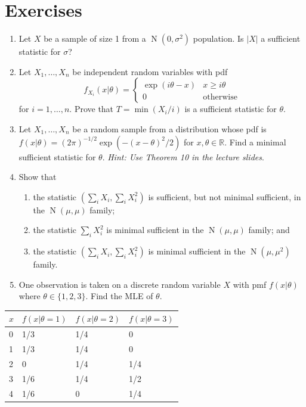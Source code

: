 \documentclass[
]{book}
\DeclareMathOperator{\N}{N}
\newcommand{\bbR}{\mathbb{R}}
\theoremstyle{definition}
\theoremstyle{definition}
\theoremstyle{definition}
\theoremstyle{definition}
\theoremstyle{remark}
\begin{document}
\hypertarget{exercises-3}{%
\section{Exercises}\label{exercises-3}}

\begin{enumerate}
\def\labelenumi{\arabic{enumi}.}
\item
  Let \(X\) be a sample of size 1 from a \(\N(0,\sigma^2)\) population. Is \(|X|\) a sufficient statistic for \(\sigma\)?
\item
  Let \(X_1,\dots,X_n\) be independent random variables with pdf
  \[
  f_{X_i}(x|\theta) = \begin{cases}
   \exp(i\theta - x) &x\geq i\theta \\
   0   &\text{otherwise}
  \end{cases}
  \]
  for \(i=1,\dots,n\). Prove that \(T=\min(X_i/i)\) is a sufficient statistic for \(\theta\).
\item
  Let \(X_1,\dots,X_n\) be a random sample from a distribution whose pdf is \(f(x|\theta)=(2\pi)^{-1/2}\exp(-(x-\theta)^2/2)\) for \(x,\theta\in\bbR\). Find a minimal sufficient statistic for \(\theta\). \textit{Hint: Use Theorem 10 in the lecture slides}.
\item
  Show that

  \begin{enumerate}
  \def\labelenumii{(\alph{enumii})}
  \item
    the statistic \((\sum_i X_i, \sum_i X_i^2)\) is sufficient, but not minimal sufficient, in the \(\N(\mu,\mu)\) family;
  \item
    the statistic \(\sum_i X_i^2\) is minimal sufficient in the \(\N(\mu,\mu)\) family; and
  \item
    the statistic \((\sum_i X_i, \sum_i X_i^2)\) is minimal sufficient in the \(\N(\mu,\mu^2)\) family.
  \end{enumerate}
\item
  One observation is taken on a discrete random variable \(X\) with pmf \(f(x|\theta)\) where \(\theta\in\{1,2,3\}.\) Find the MLE of \(\theta\).
\end{enumerate}

\begin{longtable}[]{@{}llll@{}}
\toprule
\(x\) & \(f(x|\theta=1)\) & \(f(x|\theta=2)\) & \(f(x|\theta=3)\) \\
\midrule
\endhead
0 & 1/3 & 1/4 & 0 \\
1 & 1/3 & 1/4 & 0 \\
2 & 0 & 1/4 & 1/4 \\
3 & 1/6 & 1/4 & 1/2 \\
4 & 1/6 & 0 & 1/4 \\
\bottomrule
\end{longtable}
\end{document}
